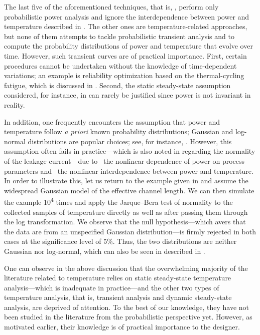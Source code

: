 The last five of the aforementioned techniques, that is, \cite{bhardwaj2006,
vrudhula2006, ghanta2006, bhardwaj2008, shen2009}, perform only probabilistic
power analysis and ignore the interdependence between power and temperature
described in . The other ones are temperature-related
approaches, but none of them attempts to tackle probabilistic transient analysis
and to compute the probability distributions of power and temperature that
evolve over time. However, such transient curves are of practical importance.
First, certain procedures cannot be undertaken without the knowledge of
time-dependent variations; an example is reliability optimization based on the
thermal-cycling fatigue, which is discussed in .
Second, the static steady-state assumption considered, for instance, in
\cite{huang2009a, juan2011, juan2012, lee2013} can rarely be justified since
power is not invariant in reality.

In addition, one frequently encounters the assumption that power and temperature
follow \emph{a priori} known probability distributions; Gaussian and log-normal
distributions are popular choices; see, for instance, \cite{bhardwaj2006,
srivastava2010, juan2012}. However, this assumption often fails in
practice---which is also noted in \cite{juan2012} regarding the normality of the
leakage current---due to \one~the nonlinear dependence of power on process
parameters and \two~the nonlinear interdependence between power and temperature.
In order to illustrate this, let us return to the example given in
 and assume the widespread Gaussian model of the
effective channel length. We can then simulate the example 10\textsuperscript{4}
times and apply the Jarque--Bera test of normality to the collected samples of
temperature directly as well as after passing them through the log
transformation. We observe that the null hypothesis---which avers that the data
are from an unspecified Gaussian distribution---is firmly rejected in both cases
at the significance level of 5\%. Thus, the two distributions are neither
Gaussian nor log-normal, which can also be seen in 
described in .

One can observe in the above discussion that the overwhelming majority of the
literature related to temperature relies on static steady-state temperature
analysis---which is inadequate in practice---and the other two types of
temperature analysis, that is, transient analysis and dynamic steady-state
analysis, are deprived of attention. To the best of our knowledge, they have not
been studied in the literature from the probabilistic perspective yet. However,
as motivated earlier, their knowledge is of practical importance to the
designer.

